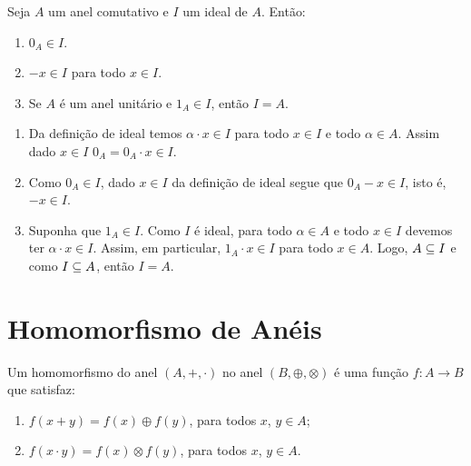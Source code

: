 \begin{proposicao}
    Seja $A$ um anel comutativo e $I$ um ideal de $A$. Ent{\~a}o:
    \begin{enumerate}[label={\roman*})]
         \item $0_{A}\in I$.
         \item $-x \in I$ para todo $x \in I$.
         \item Se $A$ é um anel unitário e $1_A \in I$, ent\~ao $I = A$.
    \end{enumerate}
\end{proposicao}
\begin{prova}
    \begin{enumerate}[label={\roman*})]
        \item Da defini\c{c}\~ao de ideal temos $\alpha \cdot x \in I$ para todo $x \in I$ e todo $\alpha \in A$.
        Assim dado $x \in I$ $0_A = 0_A \cdot x \in I$.

        \item Como $0_A \in I$, dado $x \in I$ da defini\c{c}\~ao de ideal segue que $0_A - x \in I$, isto \'e, $-x \in I$.

        \item Suponha que $1_A \in I$. Como $I$ {\'e} ideal, para todo $\alpha \in A$ e todo $x \in I$ devemos ter $\alpha\cdot x \in I$. Assim, em particular, $1_A \cdot x \in
            I$ para todo $x \in A$. Logo, $A\subseteq I$ e como $I\subseteq A$, ent{\~a}o $I = A$.
    \end{enumerate}
\end{prova}

\section{Homomorfismo de An\'eis} %
\label{sec:homomorfismo_de_aneis}

\begin{definicao}
    Um homomorfismo do anel $(A, +, \cdot)$ no anel $(B, \oplus, \otimes)$ {\'e} uma fun{\c c}{\~a}o $f : A \to B$ que satisfaz:
    \begin{enumerate}[label={\roman*})]
        \item $f(x + y) = f(x) \oplus f(y)$, para todos $x$, $y \in A$;
        \item $f(x \cdot y) = f(x)\otimes f(y)$, para todos $x$, $y \in A$.
    \end{enumerate}
\end{definicao}

